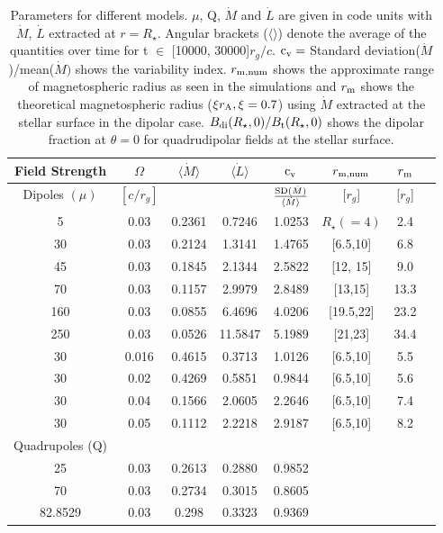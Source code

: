 \documentclass[fleqn,usenatbib]{mnras}
\newcommand{\rstar}{\ensuremath{R_{\star}}}
\begin{document}
\begin{table}
 \setlength{\tabcolsep}{0.35\tabcolsep}%
 \caption{Parameters for different models. $\mu$, Q, $\dot{M}$ and $\dot{L}$ are given in code units with $\dot{M}$, $\dot{L}$ extracted at $r = \rstar$. Angular brackets ($\langle \rangle$) denote the average of the quantities over time for t $\in$ [10000, 30000]$r_g/c$. ${\rm c_v} =$ Standard deviation($\dot{M}$)/mean($\dot{M})$ shows the variability index. $r_{\rm m,num}$ shows the approximate range of magnetospheric radius as seen in the simulations and $r_{\rm m}$ shows the theoretical magnetospheric radius ($\xi r_{\rm A}, \xi = 0.7$) using $\dot{M}$ extracted at the stellar surface in the dipolar case. $B_{\rm di}(\rstar,0)/B_{\rm t}(\rstar,0)$ shows the dipolar fraction at $\theta = 0$ for quadrudipolar fields at the stellar surface.} \label{tab:runparameters}
\centering
 \begin{tabular}{*{8}{c}} 
 \hline
 Field Strength & $\Omega$ & $\langle\dot{M}\rangle$ & $\langle\dot{L}\rangle$ & ${\rm c_v}$ & $r_{\rm m,num}$ & $r_{\rm m}$\\ [0.5ex] 
 \hline
Dipoles $(\mu)$ & $[c/r_g]$ & & & $\frac{{\rm SD}(\dot{M})}{\langle\dot{M}\rangle}$ &[$r_g$] & [$r_g$]\\
 \hline
5 & 0.03  & 0.2361 & 0.7246 & 1.0253 & $\rstar(=4)$ & 2.4\\
30 & 0.03  & 0.2124 & 1.3141 & 1.4765 & [6.5,10] & 6.8\\ 
45 & 0.03  & 0.1845 & 2.1344 & 2.5822 & [12, 15]& 9.0\\
70 &  0.03 & 0.1157 & 2.9979 & 2.8489 & [13,15]& 13.3\\ 
160 &  0.03 & 0.0855 & 6.4696 & 4.0206 & [19.5,22]& 23.2\\ 
250 &  0.03 & 0.0526 & 11.5847 & 5.1989 & [21,23]& 34.4\\ 
30  &  0.016 & 0.4615 &  0.3713 & 1.0126 & [6.5,10] & 5.5\\
30  &  0.02 & 0.4269 & 0.5851 & 0.9844 & [6.5,10] & 5.6\\
30  &  0.04 & 0.1566 & 2.0605 & 2.2646 & [6.5,10] & 7.4\\
30  &  0.05 & 0.1112 & 2.2218 & 2.9187 & [6.5,10] & 8.2\\
\hline
 Quadrupoles (Q) & &\\
\hline
25 & 0.03  & 0.2613 & 0.2880 & 0.9852\\ 
70 & 0.03  & 0.2734 & 0.3015 & 0.8605\\
82.8529 & 0.03  & 0.298 & 0.3323 & 0.9369\\

\end{tabular}
\end{table}
\end{document}
